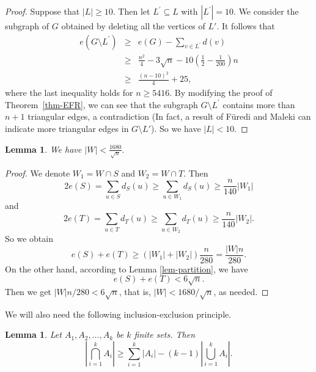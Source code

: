 \documentclass[11pt]{article}
\newtheorem{lemma}[theorem]{Lemma}
\begin{document}
\begin{proof}
 Suppose that $|L| \ge 10$.
 Then let $L^{\prime}\subseteq L$ with $|L^{\prime}|=10$. 
 We consider the subgraph of $G$ obtained by deleting all the vertices of $L'$. 
It follows that
   \begin{eqnarray*}
e(G\setminus L^{\prime}) &\ge& e(G)-\sum_{v\in L^{\prime}}d(v)\\
&\ge& \frac{n^2}{4}- 3\sqrt{n} 
-10 \left(\frac{1}{2}-\frac{1}{200} \right)n\\
&\ge & \frac{(n-10)^2}{4}+25, 
     \end{eqnarray*}
where the last  inequality holds for $n\ge 5416$. 
By modifying the proof of Theorem~\ref{thm-EFR}, 
 we can see that 
 the subgraph $G\setminus L^{\prime}$ contains more than $n+1$ triangular edges, a contradiction 
 (In fact, a result of F\"{u}redi and Maleki \cite[Theorem 1.2]{FM2017} can indicate 
 more triangular edges in $G\setminus L'$). 
So we have $|L| < 10$. 
 \end{proof}

\begin{lemma}\label{W-Lenpty}
We have
$|W| < \frac{1680}{\sqrt{n}}.$
\end{lemma}


\begin{proof}
We denote $W_1=W\cap S$ and $W_2=W\cap T$. Then 
 $$2e(S) =\sum_{u\in S}d_{S}(u) \ge  \sum_{u\in W_1}d_S(u)\ge  \frac{n}{140} |W_1| $$ 
 and 
 \[  2e(T) = \sum_{u\in T}d_{T}(u)\ge  \sum_{u\in W_2}d_T(u)
 \ge \frac{n}{140} |W_2| . \]
  So we obtain 
  \begin{equation*} \label{WL-2}
  e(S)+e(T)\ge (|W_1|+|W_2|)\frac{ n}{280} 
  =\frac{|W|  n}{280}.
  \end{equation*}
 On the other hand, according to Lemma \ref{lem-partition}, we have 
 \[  e(S)+e(T)< 6\sqrt{n}. \] 
  Then we get ${|W| n}/{280}<  6\sqrt{n}$, 
that is,
$ |W|< {1680}/{\sqrt{n}}$, as needed. 
  \end{proof}
  
  
  We will also need the following inclusion-exclusion principle.

\begin{lemma}\label{set}
Let $A_1, A_2,\dots, A_k$ be $k$  finite sets. Then
\begin{equation*}\label{set1}
\left|\bigcap_{i=1}^k A_i \right| \ge \sum_{i=1}^k |A_i|-(k-1)\left|\bigcup_{i=1}^k A_i\right|.
\end{equation*}
\end{lemma}
\end{document}
